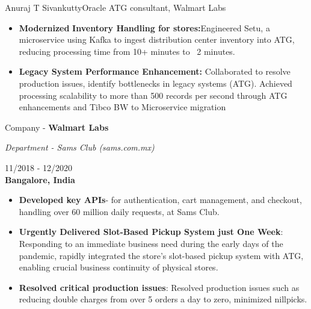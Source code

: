 \documentclass{article}
\begin{document}
\begin{cv}{Anuraj T Sivankutty}{Oracle ATG consultant, Walmart Labs}
\begin{cvevent}[Jan-2020][present]
\begin{itemize}
        \item  \textbf{Modernized} \textbf{Inventory Handling for stores:}Engineered Setu, a microservice using Kafka to ingest distribution center inventory into ATG, reducing processing time from 10+ minutes to ~2 minutes.

         \item  \textbf{Legacy System Performance Enhancement:} Collaborated to resolve production issues, identify bottlenecks in legacy systems (ATG). Achieved processing scalability to more than 500 records per second through ATG enhancements and Tibco BW to Microservice migration

    \end{itemize}
\end{cvevent}

\begin{cvevent}[Nov-2018][Dec-2020]
      \begin{center}
      \begin{minipage}{0.6\textwidth}
         Company - \textbf{Walmart Labs}
        \vspace{0.1cm}
        
        \textit{Department - Sams Club (sams.com.mx)}
      \end{minipage}
      \hfill
      \begin{minipage}{0.35\textwidth}
          \small{11/2018 - 12/2020}\\
        \textbf{Bangalore, India}
      \end{minipage}
    \end{center}
    
    \begin{itemize}
        \item  \textbf{Developed key APIs}- for authentication, cart management, and checkout, handling over 60 million daily requests, at Sams Club.

        \item \textbf{Urgently Delivered Slot-Based Pickup System just One Week}: Responding to an immediate business need during the early days of the pandemic, rapidly integrated the store's slot-based pickup system with ATG, enabling crucial business continuity of physical stores.
        
        \item  \textbf{Resolved critical production issues}: Resolved production issues such as reducing double charges from over 5 orders a day to zero, minimized nillpicks.


\end{itemize}
\end{cvevent}
\end{cv}
\end{document}
